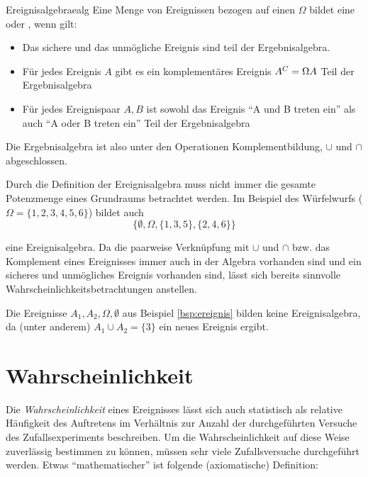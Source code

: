 \begin{definition}{Ereignisalgebra}{ealg}
Eine Menge von Ereignissen bezogen auf einen 
$\Omega$ bildet eine  oder , wenn gilt:

  \begin{itemize}
    \item Das sichere und das unmögliche Ereignis sind teil der Ergebnisalgebra.
    \item{Für jedes Ereignis $A$ gibt es ein komplementäres Ereignis $A^C =
\Omega \\ A$ Teil der Ergebnisalgebra}
    \item{Für jedes Ereignispaar $A,B$ ist sowohl das Ereignis "`A und B treten
ein"' als auch "`A oder B treten ein"' Teil der Ergebnisalgebra}
  \end{itemize}

Die Ergebnisalgebra ist also unter den Operationen Komplementbildung, $\cup$ und
$\cap$ abgeschlossen.
\end{definition}

\begin{example}
Durch die Definition der Ereignisalgebra muss nicht immer die gesamte Potenzmenge
eines Grundraums betrachtet werden. Im Beispiel des Würfelwurfs ($\Omega =
\{1,2,3,4,5,6\}$) bildet auch
\[\{\emptyset, \Omega, \{1,3,5\}, \{2,4,6\}\}\]

eine Ereignisalgebra. Da die paarweise Verknüpfung mit $\cup$ und $\cap$ bzw. das
Komplement eines Ereignisses immer auch in der Algebra vorhanden sind und ein
sicheres und unmögliches Ereignis vorhanden sind, lässt sich bereits sinnvolle
Wahrscheinlichkeitsbetrachtungen anstellen.

Die Ereignisse $A_1, A_2, \Omega, \emptyset$ aus Beispiel \ref{bsp:ereignis}
bilden keine Ereignisalgebra, da (unter anderem) $A_1 \cup A_2 = \{3\}$ ein
neues Ereignis ergibt.
\end{example}


\section{Wahrscheinlichkeit}

Die \emph{Wahrscheinlichkeit} eines Ereignisses lässt sich auch statistisch als
relative Häufigkeit des Auftretens im Verhältnis zur Anzahl der durchgeführten
Versuche des Zufallsexperiments beschreiben. Um die Wahrscheinlichkeit auf diese
Weise zuverlässig bestimmen zu können, müssen sehr viele Zufallsversuche
durchgeführt werden. Etwas "`mathematischer"' ist folgende (axiomatische)
Definition:

